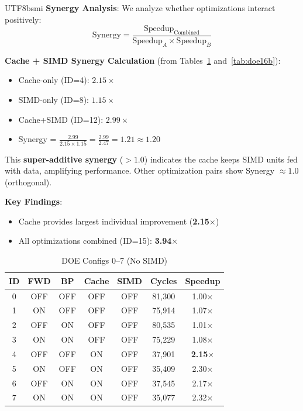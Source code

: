 \documentclass[journal,twoside]{IEEEtran}
\begin{document}
\begin{CJK}{UTF8}{bsmi}
\textbf{Synergy Analysis}: We analyze whether optimizations interact positively:
\begin{equation}
\text{Synergy} = \frac{\text{Speedup}_{\text{Combined}}}{\text{Speedup}_A \times \text{Speedup}_B}
\end{equation}

\textbf{Cache + SIMD Synergy Calculation} (from Tables~\ref{tab:doe16a} and~\ref{tab:doe16b}):
\begin{itemize}
    \item Cache-only (ID=4): $2.15\times$
    \item SIMD-only (ID=8): $1.15\times$
    \item Cache+SIMD (ID=12): $2.99\times$
    \item Synergy = $\frac{2.99}{2.15 \times 1.15} = \frac{2.99}{2.47} = \mathbf{1.21 \approx 1.20}$
\end{itemize}

This \textbf{super-additive synergy} ($>1.0$) indicates the cache keeps SIMD units fed with data, amplifying performance. Other optimization pairs show Synergy $\approx 1.0$ (orthogonal).

\textbf{Key Findings}:
\begin{itemize}
    \item Cache provides largest individual improvement (\textbf{2.15$\times$})
    \item All optimizations combined (ID=15): \textbf{3.94$\times$}
\end{itemize}

\begin{table}[!tbp]
\centering
\caption{DOE Configs 0--7 (No SIMD)}
\label{tab:doe16a}
\footnotesize
\setlength{\tabcolsep}{3pt}
\begin{tabular}{@{}ccccccc@{}}
\toprule
\textbf{ID} & \textbf{FWD} & \textbf{BP} & \textbf{Cache} & \textbf{SIMD} & \textbf{Cycles} & \textbf{Speedup} \\
\midrule
0 & OFF & OFF & OFF & OFF & 81,300 & 1.00$\times$ \\
1 & ON & OFF & OFF & OFF & 75,914 & 1.07$\times$ \\
2 & OFF & ON & OFF & OFF & 80,535 & 1.01$\times$ \\
3 & ON & ON & OFF & OFF & 75,229 & 1.08$\times$ \\
4 & OFF & OFF & ON & OFF & 37,901 & \textbf{2.15$\times$} \\
5 & ON & OFF & ON & OFF & 35,409 & 2.30$\times$ \\
6 & OFF & ON & ON & OFF & 37,545 & 2.17$\times$ \\
7 & ON & ON & ON & OFF & 35,077 & 2.32$\times$ \\
\bottomrule
\end{tabular}
\end{table}


\end{CJK}
\end{document}
